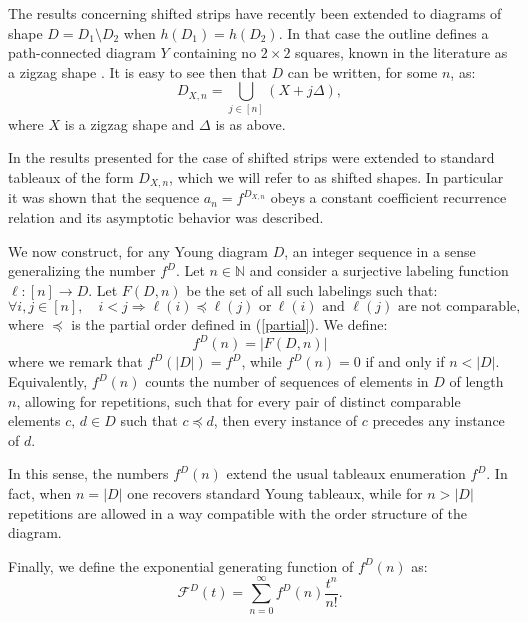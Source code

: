 \documentclass{article}
\begin{document}
The results concerning shifted strips have recently been extended to diagrams of shape $D=D_1\setminus D_2$ when $h(D_1)=h(D_2)$. In that case the outline defines a path-connected diagram $Y$ containing no $2\times2$ squares, known in the literature as a zigzag shape \cite{EnumTableaux}.
It is easy to see then that $D$ can be written, for some $n$, as:
\[
D_{X,n}=\bigcup_{j \in [n]}\left(X+j\Delta\right),
\]
where $X$ is a zigzag shape and $\Delta$ is as above.


In \cite{periodiPPartitions} the results presented for the case of shifted strips were extended to standard tableaux of the form $D_{X,n}$, which we will refer to as shifted shapes. In particular it was shown that the sequence $a_n=f^{D_{X,n}}$ obeys a constant coefficient recurrence relation and its asymptotic behavior was described.

We now construct, for any Young diagram $D$, an integer sequence in a sense generalizing the number $f^D$. Let $n\in\mathbb{N}$ and consider a surjective labeling function $\ell\colon [n]\to D$. Let $F(D,n)$ be the set of all such labelings such that:
\begin{equation}
    \forall i,j\in[n ],\quad i<j\Rightarrow\ell(i)\preceq\ell(j)\text{ or}\ \ell(i)\text{ and } \ell(j)\text{ are not comparable},
\end{equation}
where $\preceq$ is the partial order defined in (\ref{partial}).
We define:
\begin{equation}
    \label{contatore parole}
    f^D(n)=|F(D,n)|
\end{equation}
where we remark that $f^D(|D|)=f^D$, while $f^D(n)=0$ if and only if $n<|D|$. 
Equivalently, \(f^D(n)\) counts the number of sequences of elements in $D$ of length $n$, allowing for repetitions, such that for every pair of distinct comparable elements $c,\,d\in D$ such that $c\preceq d$, then every instance of $c$ precedes any instance of $d$.


In this sense, the numbers \(f^D(n)\) extend the usual tableaux enumeration \(f^D\). In fact, when \(n=|D|\) one recovers standard Young tableaux, while for \(n>|D|\) repetitions are allowed in a way compatible with the order structure of the diagram.

Finally, we define the exponential generating function of $f^D(n)$ as:
\begin{equation}
\label{egf}
\mathcal{F}^D(t)=\sum_{n=0}^\infty f^D(n)\frac{t^n}{n!}.
\end{equation}
\end{document}
